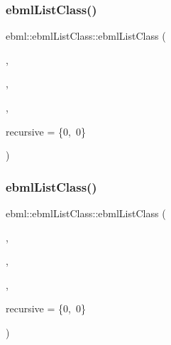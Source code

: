 \mbox{\label{classebml_1_1ebmlListClass_a24e6fe828362bc733f21ee1d122325fc}} 
\subsubsection{\texorpdfstring{ebml\+List\+Class()}{ebmlListClass()}\hspace{0.1cm}{\footnotesize\ttfamily [2/6]}}
{\footnotesize\ttfamily ebml\+::ebml\+List\+Class\+::ebml\+List\+Class (\begin{DoxyParamCaption}\item[{const char $\ast$}]{,  }\item[{std\+::wstring}]{,  }\item[{const \mbox{\hyperlink{namespaceebml_abf07998998c284c9be3f76b5d9e192e1}{child\+Class\+Spec\+Arg\+\_\+l}} \&}]{,  }\item[{const \mbox{\hyperlink{structebml_1_1occurSpec__t}{occur\+Spec\+\_\+t}} \&}]{recursive = {\ttfamily \{0,~0\}} }\end{DoxyParamCaption})}

\mbox{\label{classebml_1_1ebmlListClass_a65279c4d8e601600a55854a15e582388}} 
\subsubsection{\texorpdfstring{ebml\+List\+Class()}{ebmlListClass()}\hspace{0.1cm}{\footnotesize\ttfamily [3/6]}}
{\footnotesize\ttfamily ebml\+::ebml\+List\+Class\+::ebml\+List\+Class (\begin{DoxyParamCaption}\item[{const char $\ast$}]{,  }\item[{std\+::wstring}]{,  }\item[{\mbox{\hyperlink{namespaceebml_a40cf7ad4b58caaa8c07da3ed83f7a431}{child\+Class\+Spec\+Arg\+\_\+init\+\_\+l}}}]{,  }\item[{const \mbox{\hyperlink{structebml_1_1occurSpec__t}{occur\+Spec\+\_\+t}} \&}]{recursive = {\ttfamily \{0,~0\}} }\end{DoxyParamCaption})}

